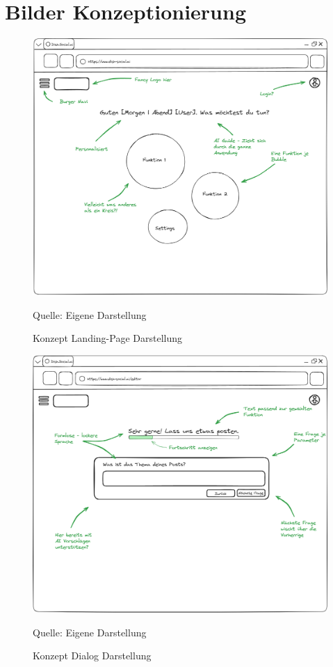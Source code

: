 \section{Bilder Konzeptionierung}\label{sec:bilder-konzeptionierung}

\begin{figure}[htbp]
    \centering
    \includegraphics[width=\textwidth]{abbildungen/Konzept/Konzept Landing Page}
    \caption[]{Konzept Landing-Page Darstellung}
    \label{fig:landing-page-concept}
    \raggedright Quelle: Eigene Darstellung
\end{figure}
\newpage

\begin{figure}[htbp]
    \centering
    \includegraphics[width=\textwidth]{abbildungen/Konzept/Konzept Dialog}
    \caption[]{Konzept Dialog Darstellung}
    \label{fig:dialog-concept}
    \raggedright Quelle: Eigene Darstellung
\end{figure}
\newpage

